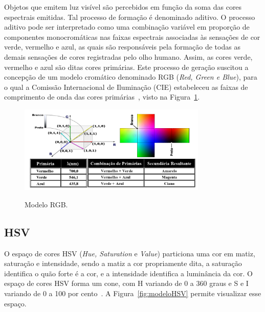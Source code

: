 Objetos que emitem luz visível são percebidos em função da soma das cores espectrais emitidas. Tal processo de formação é denominado aditivo. O processo aditivo pode ser interpretado como uma combinação variável em proporção de componentes monocromáticas nas faixas espectrais associadas às sensações de cor verde, vermelho e azul, as quais são responsáveis pela formação de todas as demais sensações de cores registradas pelo olho humano. Assim, as cores verde, vermelho e azul são ditas cores primárias. Este processo de geração suscitou a concepção de um modelo cromático denominado RGB (\textit{Red, Green e Blue}), para o qual a Comissão Internacional de Iluminação (CIE) estabeleceu as faixas de comprimento de onda das cores primárias~\cite{de2006introduccao}, visto na Figura~\ref{fig:modeloRGB}.

\begin{figure}[!hbtp]
  \centering
   \caption{Modelo RGB.}
    \includegraphics[width = 0.8\textwidth]{Caps/Figs/ref-teorico/modelo-RGB.png}
   \label{fig:modeloRGB}
\end{figure}

\subsection{HSV}
\label{subsec:hsv}

O espaço de cores HSV (\textit{Hue, Saturation} e \textit{Value}) particiona uma cor em matiz, saturação e intensidade, sendo a matiz a cor propriamente dita, a saturação identifica o quão forte é a cor, e a intensidade identifica a luminância da cor. O espaço de cores HSV forma um cone, com H variando de 0 a 360 graus e S e I variando de 0 a 100 por cento~\cite{penharbel2004filtro}. A Figura~\ref{fig:modeloHSV} permite visualizar esse espaço.

